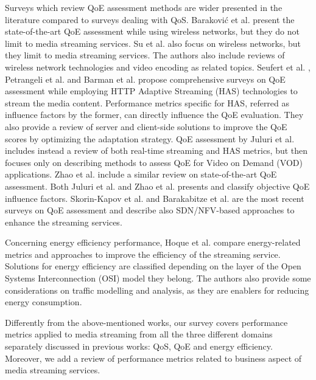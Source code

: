 Surveys which review QoE assessment methods are wider presented in the literature compared to surveys dealing with QoS. Baraković et al. \cite{Barakovic2013} present the state-of-the-art QoE assessment while using wireless networks, but they do not limit to media streaming services.
Su et al. \cite{Su2016} also focus on wireless networks, but they limit to media streaming services. The authors also include reviews of wireless network technologies and video encoding as related topics. Seufert et al. \cite{Seufert2014}, Petrangeli et al. \cite{Petrangeli2018} and Barman et al. \cite{Barman2019} propose comprehensive surveys on QoE assessment while employing HTTP Adaptive Streaming (HAS) technologies to stream the media content. Performance metrics specific for HAS, referred as influence factors by the former, can directly influence the QoE evaluation. They also provide a review of server and client-side solutions to improve the QoE scores by optimizing the adaptation strategy.
QoE assessment by Juluri et al. \cite{Juluri2015} includes instead a review of both real-time streaming and HAS metrics, but then focuses only on describing methods to assess QoE for Video on Demand (VOD) applications. Zhao et al. \cite{Zhao2016} include a similar review on state-of-the-art QoE assessment. Both Juluri et al. \cite{Juluri2015} and Zhao et al. \cite{Zhao2016} presents and classify objective QoE influence factors.
Skorin-Kapov et al. \cite{Skorin-Kapov2018} and Barakabitze et al. \cite{Barakabitze2019-2} are the most recent surveys on QoE assessment and describe also SDN/NFV-based approaches to enhance the streaming services.

Concerning energy efficiency performance, Hoque et al. \cite{Hoque2012} compare energy-related metrics and approaches to improve the efficiency of the streaming service. Solutions for energy efficiency are classified depending on the layer of the Open Systems Interconnection (OSI) model they belong. The authors also provide some considerations on traffic modelling and analysis, as they are enablers for reducing energy consumption.

Differently from the above-mentioned works, our survey covers performance metrics applied to media streaming from all the three different domains separately discussed in previous works: QoS, QoE and energy efficiency. Moreover, we add a review of performance metrics related to business aspect of media streaming services.

